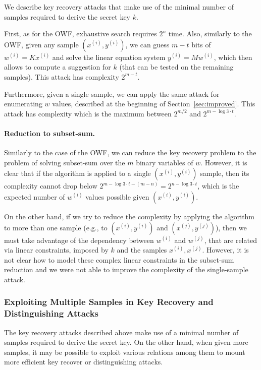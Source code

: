 \documentclass{article}
\begin{document}
We describe key recovery attacks that make use of the minimal number of samples required to derive the secret key $k$.

First, as for the OWF, exhaustive search requires $2^{n}$ time. Also,
similarly to the OWF, given any sample $(x^{(i)},y^{(i)})$, we can guess $m - t$ bits of $w^{(i)} = K x^{(i)}$ and solve the linear equation system $y^{(i)} = M w^{(i)}$, which then allows to compute a suggestion for $k$ (that can be tested on the remaining samples). This attack has complexity $2^{m-t}$.

Furthermore, given a single sample, we can apply the same attack for enumerating $w$ values,
described at the beginning of Section~\ref{sec:improved}. This attack has complexity which is the maximum between $2^{m/2}$ and $2^{m - \log 3 \cdot t}$.

\paragraph{Reduction to subset-sum.}
Similarly to the case of the OWF, we can reduce the key recovery problem to the problem of solving subset-sum over the $m$ binary variables of $w$. However, it is clear that if the algorithm is applied to a single $(x^{(i)},y^{(i)})$ sample, then its complexity cannot drop below $2^{m - \log 3 \cdot t - (m -n)} = 2^{n - \log 3 \cdot t}$, which is the expected number of $w^{(i)}$ values possible given $(x^{(i)},y^{(i)})$.

On the other hand, if we try to reduce the complexity by applying the algorithm to more than one sample (e.g., to $(x^{(i)},y^{(i)})$ and $(x^{(j)},y^{(j)})$), then we must take advantage of the dependency between $w^{(i)}$ and $w^{(j)}$, that are related via linear constraints, imposed by $k$ and the samples $x^{(i)},x^{(j)}$. However, it is not clear how to model these complex linear constraints in the subset-sum reduction and we were not able to improve the complexity of the single-sample attack.

\subsubsection{Exploiting Multiple Samples in Key Recovery and Distinguishing Attacks}

The key recovery attacks described above make use of a minimal number of samples required to derive the secret key. On the other hand, when given more samples, it may be possible to exploit various relations among them to mount more efficient key recover or distinguishing attacks.
\end{document}
